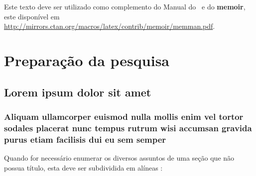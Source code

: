 \documentclass[12pt,openright,twoside,a4paper]{abntex2}
\begin{document}
Este texto deve ser utilizado como complemento do Manual do \abnTeX~e do
\textbf{memoir}, este disponível em
\url{http://mirrors.ctan.org/macros/latex/contrib/memoir/memman.pdf}.


\part{Preparação da pesquisa}

\chapter{Lorem ipsum dolor sit amet}


\section{Aliquam ullamcorper euismod nulla mollis enim vel tortor sodales placerat nunc
tempus rutrum wisi accumsan gravida purus etiam facilisis dui eu sem semper}

Quando for necessário enumerar os diversos assuntos de uma seção que não possua
título, esta deve ser subdividida em alíneas \cite[4.2]{NBR6024:2012}:
\end{document}
